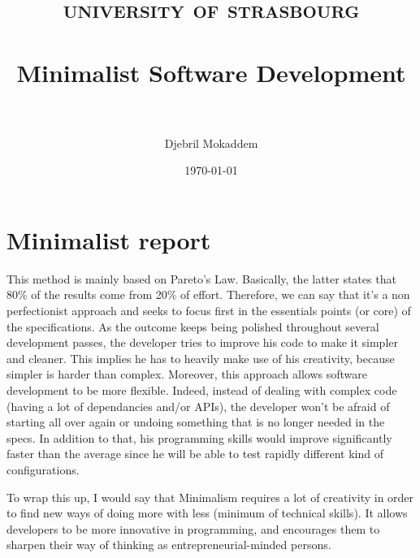\documentclass[paper=a4, fontsize=11pt]{scrartcl}
\title{	
\normalfont \normalsize 
\textsc{university of strasbourg} \\ [25pt]
\horrule{0.5pt} \\[0.4cm]
\huge Minimalist Software Development \\
\horrule{2pt} \\[0.5cm]
}
\author{Djebril Mokaddem}
\date{\normalsize\today}
\begin{document}
\maketitle

\section{Minimalist report}

This method is mainly based on Pareto's Law. Basically, the latter states that 80\% of the results come from 20\% of effort. Therefore, we can say that it's a non perfectionist approach and seeks to focus first in the essentials points (or core) of the specifications. As the outcome keeps being polished throughout several development passes, the developer tries to improve his code to make it simpler and cleaner. This implies he has to heavily make use of his creativity, because simpler is harder than complex. Moreover, this approach allows software development to be more flexible. Indeed, instead of dealing with complex code (having a lot of dependancies and/or APIs), the developer won't be afraid of starting all over again or undoing something that is no longer needed in the specs. In addition to that, his programming skills would improve significantly faster than the average since he will be able to test rapidly different kind of configurations.\newline

To wrap this up, I would say that Minimalism requires a lot of creativity in order to find new ways of doing more with less (minimum of technical skills). It allows developers to be more innovative in programming, and encourages them to sharpen their way of thinking as entrepreneurial-minded persons.
\end{document}
